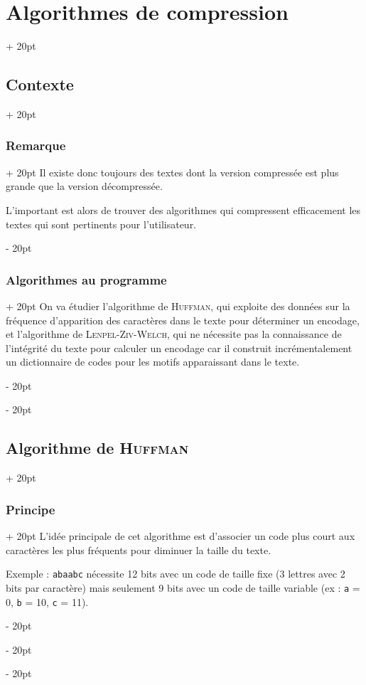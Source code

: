 \documentclass[a4paper, 12pt, twoside]{article}
\newcommand{\ind}[1][20pt]{\advance\leftskip + #1}
\newcommand{\deind}[1][20pt]{\advance\leftskip - #1}
\newenvironment{indt}[2][20pt]{#2 \par \ind[#1]}{\par \deind} %
\begin{document}
\begin{indt}{\section{Algorithmes de compression}}
\begin{indt}{\subsection{Contexte}}
\begin{indt}{\subsubsection{Remarque}}
                Il existe donc toujours des textes dont la version compressée est plus grande que la version décompressée.

                L'important est alors de trouver des algorithmes qui compressent efficacement les textes qui sont pertinents pour l'utilisateur.
            \end{indt}

            \vspace{12pt}
            
            \begin{indt}{\subsubsection{Algorithmes au programme}}
                On va étudier l'algorithme de \textsc{Huffman}, qui exploite des données sur la fréquence d'apparition des caractères dans le texte pour déterminer un encodage, et l'algorithme de \textsc{Lenpel-Ziv-Welch}, qui ne nécessite pas la connaissance de l'intégrité du texte pour calculer un encodage car il construit incrémentalement un dictionnaire de codes pour les motifs apparaissant dans le texte.
            \end{indt}
        \end{indt}

        \vspace{12pt}
        
        \begin{indt}{\subsection{Algorithme de \textsc{Huffman}}}
            \begin{indt}{\subsubsection{Principe}}
                L'idée principale de cet algorithme est d'associer un code plus court aux caractères les plus fréquents pour diminuer la taille du texte.

                \vspace{12pt}
                
                Exemple : \texttt{abaabc} nécessite 12 bits avec un code de taille fixe (3 lettres avec 2 bits par caractère) mais seulement 9 bits avec un code de taille variable (ex : \texttt a = 0, \texttt b = 10, \texttt c = 11).


\end{indt}
\end{indt}
\end{indt}
\end{document}

